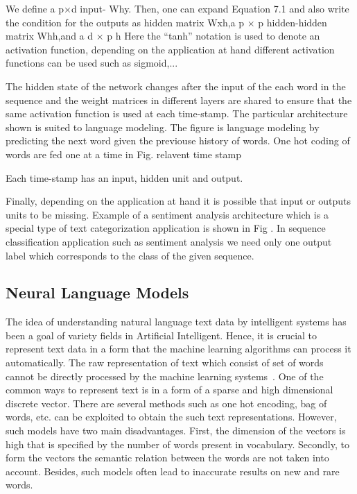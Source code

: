 We define a p×d input-
Why. Then, one can expand Equation 7.1 and also write the condition for the outputs as hidden matrix Wxh,a p × p hidden-hidden matrix Whh,and a d × p h
 Here the “tanh” notation is used to denote an activation function, depending on the application at hand different activation functions can be used such as sigmoid,...

The hidden state of the network changes after the input of the each word in the sequence and the weight matrices in different layers are shared to ensure that the same activation function is used at each time-stamp. The particular architecture shown is suited to language modeling. The figure is  language modeling by predicting the next word given the previouse history of words. One hot coding of words are fed one at a time in Fig. relavent time stamp
 

Each time-stamp has an input, hidden unit and output. 

Finally, depending on the application at hand it is possible that input or outputs units to be missing. Example of a sentiment analysis architecture which is a special type of text categorization application is shown in Fig . In sequence classification application such as sentiment analysis we need only one output label which corresponds to the class of the given sequence. 

\subsection{Neural Language Models}
The idea of understanding natural language text data by intelligent systems has been a goal of variety fields in Artificial Intelligent. Hence, it is crucial to represent text data in a form that the machine learning algorithms can process it automatically.  %
The raw representation of text which consist of set of words cannot be directly processed by the machine learning systems~\cite{srinivasan2017guide}. One of the common ways to represent text is %
in a form of a sparse and high dimensional discrete vector. There are several methods such as one hot encoding, bag of words, etc. can be exploited to obtain the such text representations. However, such models have two main disadvantages. First, the dimension of the vectors is high that is specified by the number of words present in vocabulary.  Secondly, to form the vectors the semantic relation between the words are not taken into account.  Besides, such models often lead to inaccurate results on new and rare words. 

